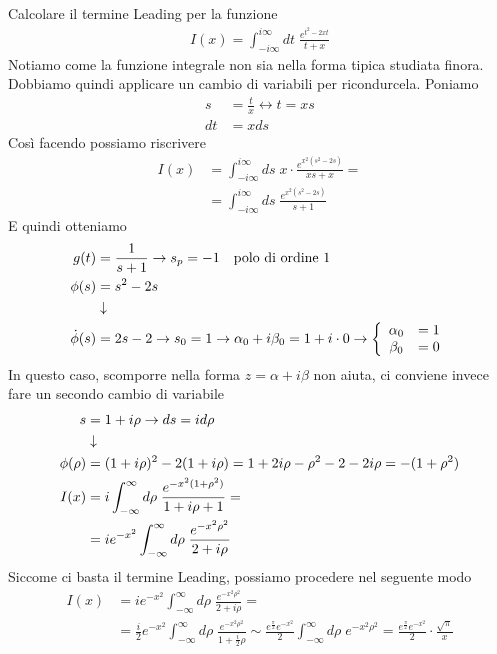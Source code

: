 Calcolare il termine Leading per la funzione
\begin{align}
	I(x) = \int_{-i\infty}^{i\infty} dt \; \frac{e^{t^2 - 2xt}}{t+x}
\end{align}
Notiamo come la funzione integrale non sia nella forma tipica studiata finora. Dobbiamo quindi applicare un cambio di variabili per ricondurcela. Poniamo
\begin{align}
	s &= \frac{t}{x} \leftrightarrow t = xs\\
	dt &= x ds
\end{align}
Così facendo possiamo riscrivere
\begin{align}
	I(x) &= \int_{-i\infty}^{i\infty} ds \; x\cdot \frac{e^{x^2(s^2 - 2s)}}{xs+x} = \nonumber\\
	&= \int_{-i\infty}^{i\infty} ds \; \frac{e^{x^2(s^2 - 2s)}}{s+1}
\end{align}
E quindi otteniamo
\begin{align}
	g(t) &= \frac{1}{s+1} \to s_p = -1 \quad \text{polo di ordine 1}\\
	\phi(s) &= s^2 -2s \\ &\downarrow \nonumber \\
	\dot{\phi}(s) &= 2s -2 \to s_0 = 1 \to \alpha_0 + i\beta_0 = 1 + i\cdot 0 \to \left\{ \begin{array}{cc} \alpha_0 &= 1\\ \beta_0 &= 0 \end{array} \right.
\end{align}
In questo caso, scomporre nella forma $z = \alpha + i \beta$ non aiuta, ci conviene invece fare un secondo cambio di variabile
\begin{align}
	s &= 1+ i \rho \to ds = id\rho\\ &\downarrow \nonumber \\
	\phi(\rho) &= (1+ i \rho)^2 - 2(1+ i \rho) = 1+2i\rho -\rho^2 -2 -2i\rho = -(1 +\rho^2)\\
	I(x) &= i\int_{-\infty}^{\infty} d\rho \; \frac{e^{-x^2(1 +\rho^2)}}{1+i\rho+1} = \nonumber\\
	&= ie^{-x^2}\int_{-\infty}^{\infty} d\rho \; \frac{e^{-x^2\rho^2}}{2+i\rho}
\end{align}	
Siccome ci basta il termine Leading, possiamo procedere nel seguente modo
\begin{align}
	I(x) &= ie^{-x^2}\int_{-\infty}^{\infty} d\rho \; \frac{e^{-x^2\rho^2}}{2+i\rho} = \nonumber\\
	&= \frac{i}{2}e^{-x^2}\int_{-\infty}^{\infty} d\rho \; \frac{e^{-x^2\rho^2}}{1+\frac{i}{2}\rho}\sim \frac{e^{\frac{\pi}{2}}e^{-x^2}}{2}\int_{-\infty}^{\infty} d\rho \; e^{-x^2\rho^2} = \frac{e^{\frac{\pi}{2}}e^{-x^2}}{2} \cdot \frac{\sqrt{\pi}}{x}
\end{align}	


